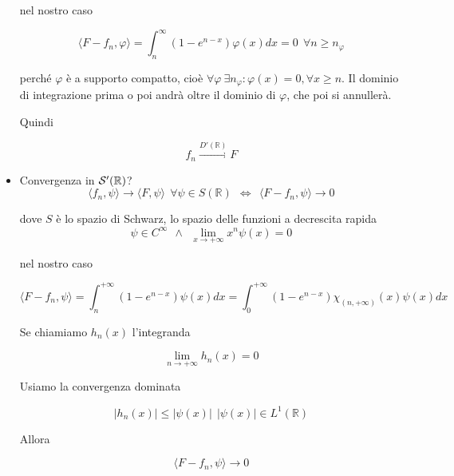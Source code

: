 \begin{itemize}
nel nostro caso

\begin{equation*}
\langle F-f_{n} ,\varphi \rangle =\int ^{\infty }_{n}\left( 1-e^{n-x}\right) \varphi (x)dx=0\ \ \forall n\geqslant n_{\varphi }
\end{equation*}

perché $\varphi $ è a supporto compatto, cioè $\forall \varphi \ \exists n_{\varphi } :\varphi ( x) =0,\forall x\geqslant n$. Il dominio di integrazione prima o poi andrà oltre il dominio di $\varphi $, che poi si annullerà.

Quindi

\begin{equation*}
f_{n}\xrightarrow{D'(\mathbb{R} )} F
\end{equation*}
\item Convergenza in $\mathcal{S}  '(\mathbb{R} )$?\begin{equation*}
\langle f_{n} ,\psi \rangle \rightarrow \langle F,\psi \rangle \ \ \forall \psi \in S(\mathbb{R}) \ \ \iff \ \ \langle F-f_{n} ,\psi \rangle \rightarrow 0
\end{equation*}

dove $S$ è lo spazio di Schwarz, lo spazio delle funzioni a decrescita rapida\begin{equation*}
\psi \in C^{\infty } \ \ \land \ \ \lim\limits _{x\rightarrow +\infty } x^{n} \psi ( x) =0
\end{equation*}

nel nostro caso

\begin{equation*}
\langle F-f_{n} ,\psi \rangle =\int ^{+\infty }_{n}\left( 1-e^{n-x}\right) \psi ( x) dx=\int ^{+\infty }_{0}\left( 1-e^{n-x}\right) \chi _{( n,+\infty )}( x) \psi ( x) dx
\end{equation*}

Se chiamiamo $h_{n}( x)$ l'integranda

\begin{equation*}
\lim\limits _{n\rightarrow +\infty } h_{n}( x) =0
\end{equation*}

Usiamo la convergenza dominata

\begin{equation*}
| h_{n}( x)| \leqslant | \psi ( x)| \ \ | \psi ( x)| \in L^{1}(\mathbb{R})
\end{equation*}

Allora

\begin{equation*}
\langle F-f_{n} ,\psi \rangle \rightarrow 0
\end{equation*}
\end{itemize}
